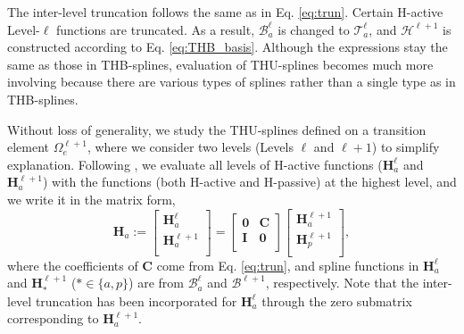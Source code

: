 \documentclass[graybox]{svmult}
\begin{document}
The inter-level truncation follows the same as in Eq. \eqref{eq:trun}. Certain H-active Level-$\ell$ functions are truncated. As a result, $\mathcal{B}_a^\ell$ is changed to $\mathcal{T}_a^\ell$, and $\mathcal{H}^{\ell+1}$ is constructed according to Eq. \eqref{eq:THB_basis}. Although the expressions stay the same as those in THB-splines, evaluation of THU-splines becomes much more involving because there are various types of splines rather than a single type as in THB-splines.

Without loss of generality, we study the THU-splines defined on a transition element $\Omega_e^{\ell+1}$, where we consider two levels (Levels $\ell$ and $\ell+1$) to simplify explanation. Following \cite{ref:bornermann13}, we evaluate all levels of H-active functions ($\bm{H}_{a}^{\ell}$ and $\bm{H}_{a}^{\ell+1}$) with the functions (both H-active and H-passive) at the highest level, and we write it in the matrix form, 
\begin{equation}
\bm{H}_a :=
\begin{bmatrix}
\bm{H}_{a}^\ell \\ \bm{H}_a^{\ell+1} \\
\end{bmatrix}=
\begin{bmatrix}
\bm{0} & \bm{C} \\
\bm{I} & \bm{0} \\
\end{bmatrix}
\begin{bmatrix}
\bm{H}_a^{\ell+1} \\ \bm{H}_p^{\ell+1} \\
\end{bmatrix},
\label{eq:thu_bf_0}
\end{equation}
where the coefficients of $\bm{C}$ come from Eq. \eqref{eq:trun}, and spline functions in $\bm{H}_{a}^{\ell}$ and $\bm{H}_{*}^{\ell+1}$ ($*\in\{a,p\}$) are from $\mathcal{B}_a^\ell$ and $\mathcal{B}^{\ell+1}$, respectively. Note that the inter-level truncation has been incorporated for $\bm{H}_a^{\ell}$ through the zero submatrix corresponding to $\bm{H}_a^{\ell+1}$. 
\end{document}
